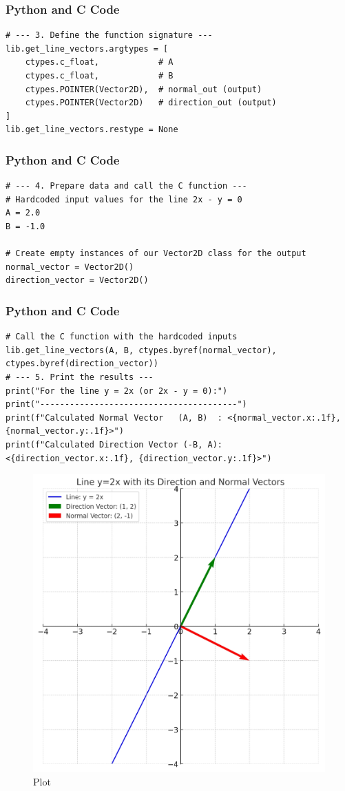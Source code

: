 \documentclass{beamer}
\begin{document}
\begin{frame}[fragile]
\frametitle{Python and C Code}
\begin{lstlisting}
# --- 3. Define the function signature ---
lib.get_line_vectors.argtypes = [
    ctypes.c_float,            # A
    ctypes.c_float,            # B
    ctypes.POINTER(Vector2D),  # normal_out (output)
    ctypes.POINTER(Vector2D)   # direction_out (output)
]
lib.get_line_vectors.restype = None
\end{lstlisting}
\end{frame}


\begin{frame}[fragile]
\frametitle{Python and C Code}
\begin{lstlisting}
# --- 4. Prepare data and call the C function ---
# Hardcoded input values for the line 2x - y = 0
A = 2.0
B = -1.0

# Create empty instances of our Vector2D class for the output
normal_vector = Vector2D()
direction_vector = Vector2D()
\end{lstlisting}
\end{frame}

\begin{frame}[fragile]
\frametitle{Python and C Code}
\begin{lstlisting}
# Call the C function with the hardcoded inputs
lib.get_line_vectors(A, B, ctypes.byref(normal_vector), ctypes.byref(direction_vector))
# --- 5. Print the results ---
print("For the line y = 2x (or 2x - y = 0):")
print("----------------------------------------")
print(f"Calculated Normal Vector   (A, B)  : <{normal_vector.x:.1f}, {normal_vector.y:.1f}>")
print(f"Calculated Direction Vector (-B, A): <{direction_vector.x:.1f}, {direction_vector.y:.1f}>")
\end{lstlisting}
\end{frame}
\begin{frame}
\begin{figure}
    \centering
    \includegraphics[width=0.75\columnwidth]{graph-6.jpg}
    \caption{Plot}
    \label{fig:placeholder}
\end{figure}
\end{frame}
\end{document}
